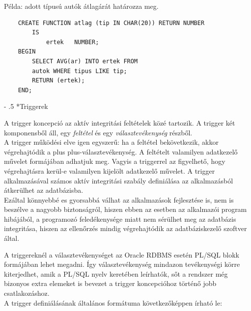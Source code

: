 \documentclass[tikz,12pt,margin=0px]{article}
\makeatletter
\renewcommand\paragraph{%
	\@startsection{paragraph}{4}{0mm}%
	{-\baselineskip}%
	{.5\baselineskip}%
	{\normalfont\normalsize\bfseries}}
\newcommand\lword[1]{\leavevmode\nobreak\hskip0pt plus\linewidth\penalty50\hskip0pt plus-\linewidth\nobreak #1}
\makeatother
\begin{document}
    \noindent Példa: adott típusú autók átlagárát határozza meg.
    {\small
    \begin{verbatim}
    CREATE FUNCTION atlag (tip IN CHAR(20)) RETURN NUMBER
        IS
            ertek	NUMBER;
    BEGIN
        SELECT AVG(ar) INTO ertek FROM
        autok WHERE tipus LIKE tip;
        RETURN (ertek);
    END;
    \end{verbatim}
    }

    \paragraph*{Triggerek}

    \noindent A trigger koncepció az aktív integritási feltételek közé tartozik. A trigger két komponensből áll, egy \emph{feltétel} és egy \emph{választevékenység} részből.\\
    A trigger működési elve igen egyszerű: ha a feltétel bekövetkezik, akkor végrehajtódik a \lword{választevékenység}. A feltételt valamilyen adatkezelő művelet formájában adhatjuk meg. Vagyis a triggerrel az figyelhető, hogy végrehajtásra kerül-e valamilyen kijelölt adatkezelő művelet. A trigger alkalmazásával számos aktív integritási szabály definiálása az alkalmazásból átkerülhet az adatbázisba. \\

    {\small
    \noindent Ezáltal könnyebbé es gyorsabbá válhat az alkalmazások fejlesztése is, nem is beszélve a nagyobb biztonságról, hiszen ebben az esetben az alkalmazói program hibájából, a programozó feledékenysége miatt nem sérülhet meg az adatbázis integritása, hiszen az ellenőrzés mindig végrehajtódik az adatbáziskezelő szoftver által.\\
    }

    \noindent A triggereknél a választevékenységet az Oracle RDBMS esetén PL/SQL blokk formájában lehet megadni. Így választevékenység mindazon tevékenységi körre kiterjedhet, amik a PL/SQL nyelv keretében leírhatók, sőt a rendszer még bizonyos extra elemeket is bevezet a trigger koncepcióhoz történő jobb csatlakozáshoz.\\

    \noindent A trigger definiálásának általános formátuma következőképpen írható le:
\end{document}
